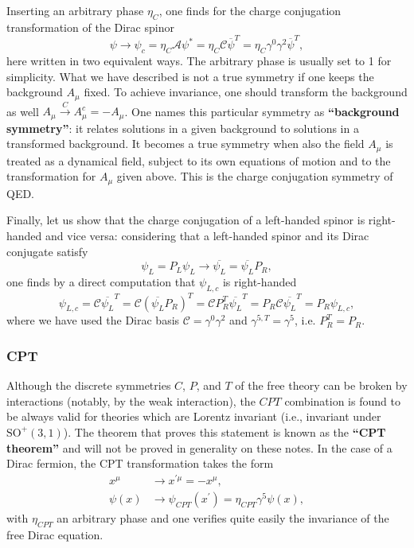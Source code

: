 Inserting an arbitrary phase \(\eta_C\), one finds for the charge conjugation transformation of the Dirac spinor
\[
    \psi \to \psi_c = \eta_C \mathcal{A} \psi^* = \eta_C \mathcal{C} \overline{\psi}^T = \eta_C \gamma^0 \gamma^2 \overline{\psi}^T,
\]
here written in two equivalent ways. The arbitrary phase is usually set to 1 for simplicity. What we have described is not a true symmetry if one keeps the background \(A_\mu\) fixed. To achieve invariance, one should transform the background as well \(A_\mu \xrightarrow{C} A_\mu^c = -A_\mu\). One names this particular symmetry as \textbf{“background symmetry”}: it relates solutions in a given background to solutions in a transformed background. It becomes a true symmetry when also the field \(A_\mu\) is treated as a dynamical field, subject to its own equations of motion and to the transformation for \(A_\mu\) given above. This is the charge conjugation symmetry of QED.

Finally, let us show that the charge conjugation of a left-handed spinor is right-handed and vice versa: considering that a left-handed spinor and its Dirac conjugate satisfy
\[
    \psi_L = P_L \psi_L \to \overline{\psi_L} = \overline{\psi_L} P_R,
\]
one finds by a direct computation that \(\psi_{L,c}\) is right-handed
\[
    \psi_{L,c} = \mathcal{C} \overline{\psi_L}^T = \mathcal{C} ( \overline{\psi_L} P_R )^T = \mathcal{C} P_R^T \overline{\psi_L}^T = P_R \mathcal{C} \overline{\psi_L}^T = P_R \psi_{L,c},
\]
where we have used the Dirac basis \(\mathcal{C} = \gamma^0\gamma^2\) and \(\gamma^{5,T} = \gamma^5\), i.e. \(P_R^T = P_R\).

\subsubsection{CPT}

Although the discrete symmetries \(C\), \(P\), and \(T\) of the free theory can be broken by interactions (notably, by the weak interaction), the \(CPT\) combination is found to be always valid for theories which are Lorentz invariant (i.e., invariant under \(\mathrm{SO}^+(3,1)\)). The theorem that proves this statement is known as the \textbf{“CPT theorem”} and will not be proved in generality on these notes. In the case of a Dirac fermion, the CPT transformation takes the form
\[
    \begin{aligned}
        x^{\mu} & \to x^{\prime \mu} = - x^{\mu},                          \\
        \psi(x) & \to \psi_{CPT}(x^{\prime}) = \eta_{CPT}\gamma^5 \psi(x),
    \end{aligned}
\]
with \(\eta_{CPT}\) an arbitrary phase and one verifies quite easily the invariance of the free Dirac equation.

